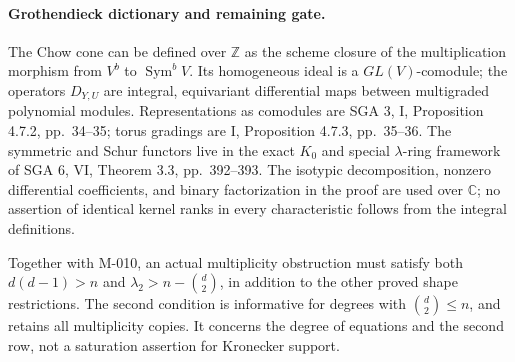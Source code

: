 \paragraph{Grothendieck dictionary and remaining gate.}
The Chow cone can be defined over $\mathbb Z$ as the scheme
closure of the multiplication morphism from $V^b$ to
$\operatorname{Sym}^bV$. Its homogeneous ideal is a
$GL(V)$-comodule; the operators $D_{Y,U}$ are integral,
equivariant differential maps between multigraded polynomial
modules. Representations as comodules are SGA 3, I,
Proposition 4.7.2, pp.~34--35; torus gradings are I,
Proposition 4.7.3, pp.~35--36. The symmetric and Schur
functors live in the exact $K_0$ and special $\lambda$-ring
framework of SGA 6, VI, Theorem 3.3, pp.~392--393.
The isotypic decomposition, nonzero differential coefficients,
and binary factorization in the proof are used over
$\mathbb C$; no assertion of identical kernel ranks in every
characteristic follows from the integral definitions.

Together with M-010, an actual multiplicity obstruction must
satisfy both $d(d-1)>n$ and
$\lambda_2>n-\binom d2$, in addition to the other proved
shape restrictions. The second condition is informative for
degrees with $\binom d2\leq n$, and retains all multiplicity
copies. It concerns the degree of equations and the second row,
not a saturation assertion for Kronecker support.
